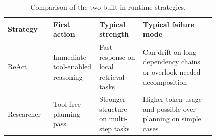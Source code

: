 \begin{table}[t]
\centering
\caption{Comparison of the two built-in runtime strategies.}
\label{tab:strategy_compare}
\small
\begin{tabular}{p{0.16\linewidth}p{0.18\linewidth}p{0.18\linewidth}p{0.30\linewidth}}
\toprule
\textbf{Strategy} & \textbf{First action} & \textbf{Typical strength} & \textbf{Typical failure mode} \\
\midrule
ReAct & Immediate tool-enabled reasoning & Fast response on local retrieval tasks & Can drift on long dependency chains or overlook needed decomposition \\
Researcher & Tool-free planning pass & Stronger structure on multi-step tasks & Higher token usage and possible over-planning on simple cases \\
\bottomrule
\end{tabular}

\end{table}

